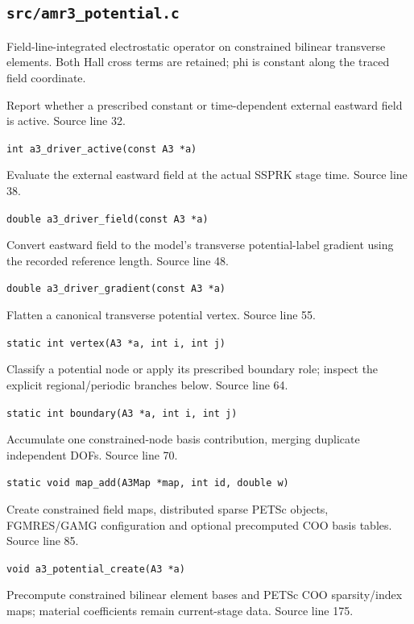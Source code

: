 \subsection{\texttt{src/amr3\_potential.c}}
Field-line-integrated electrostatic operator on constrained bilinear transverse elements. Both Hall cross terms are retained; phi is constant along the traced field coordinate.
\begin{description}[style=nextline,leftmargin=0pt,labelindent=0pt,labelwidth=0pt,labelsep=0pt]
\item[\texttt{a3\_driver\_active}] Report whether a prescribed constant or time-dependent external eastward field is active. Source line 32.\par
{\small\nolinkurl{int a3_driver_active(const A3 *a)}}
\item[\texttt{a3\_driver\_field}] Evaluate the external eastward field at the actual SSPRK stage time. Source line 38.\par
{\small\nolinkurl{double a3_driver_field(const A3 *a)}}
\item[\texttt{a3\_driver\_gradient}] Convert eastward field to the model's transverse potential-label gradient using the recorded reference length. Source line 48.\par
{\small\nolinkurl{double a3_driver_gradient(const A3 *a)}}
\item[\texttt{vertex}] Flatten a canonical transverse potential vertex. Source line 55.\par
{\small\nolinkurl{static int vertex(A3 *a, int i, int j)}}
\item[\texttt{boundary}] Classify a potential node or apply its prescribed boundary role; inspect the explicit regional/periodic branches below. Source line 64.\par
{\small\nolinkurl{static int boundary(A3 *a, int i, int j)}}
\item[\texttt{map\_add}] Accumulate one constrained-node basis contribution, merging duplicate independent DOFs. Source line 70.\par
{\small\nolinkurl{static void map_add(A3Map *map, int id, double w)}}
\item[\texttt{a3\_potential\_create}] Create constrained field maps, distributed sparse PETSc objects, FGMRES/GAMG configuration and optional precomputed COO basis tables. Source line 85.\par
{\small\nolinkurl{void a3_potential_create(A3 *a)}}
\item[\texttt{coo\_create}] Precompute constrained bilinear element bases and PETSc COO sparsity/index maps; material coefficients remain current-stage data. Source line 175.\par

\end{description}

